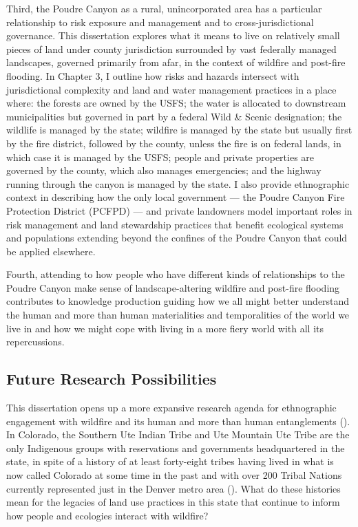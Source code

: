 \documentclass[
]{article}
\begin{document}
Third, the Poudre Canyon as a rural, unincorporated area has a particular relationship to risk exposure and management and to cross-jurisdictional governance. This dissertation explores what it means to live on relatively small pieces of land under county jurisdiction surrounded by vast federally managed landscapes, governed primarily from afar, in the context of wildfire and post-fire flooding. In Chapter 3, I outline how risks and hazards intersect with jurisdictional complexity and land and water management practices in a place where: the forests are owned by the USFS; the water is allocated to downstream municipalities but governed in part by a federal Wild \& Scenic designation; the wildlife is managed by the state; wildfire is managed by the state but usually first by the fire district, followed by the county, unless the fire is on federal lands, in which case it is managed by the USFS; people and private properties are governed by the county, which also manages emergencies; and the highway running through the canyon is managed by the state. I also provide ethnographic context in describing how the only local government --- the Poudre Canyon Fire Protection District (PCFPD) --- and private landowners model important roles in risk management and land stewardship practices that benefit ecological systems and populations extending beyond the confines of the Poudre Canyon that could be applied elsewhere.

Fourth, attending to how people who have different kinds of relationships to the Poudre Canyon make sense of landscape-altering wildfire and post-fire flooding contributes to knowledge production guiding how we all might better understand the human and more than human materialities and temporalities of the world we live in and how we might cope with living in a more fiery world with all its repercussions.

\subsection{Future Research Possibilities}\label{future-research-possibilities}

This dissertation opens up a more expansive research agenda for ethnographic engagement with wildfire and its human and more than human entanglements (). In Colorado, the Southern Ute Indian Tribe and Ute Mountain Ute Tribe are the only Indigenous groups with reservations and governments headquartered in the state, in spite of a history of at least forty-eight tribes having lived in what is now called Colorado at some time in the past and with over 200 Tribal Nations currently represented just in the Denver metro area (). What do these histories mean for the legacies of land use practices in this state that continue to inform how people and ecologies interact with wildfire?
\end{document}
